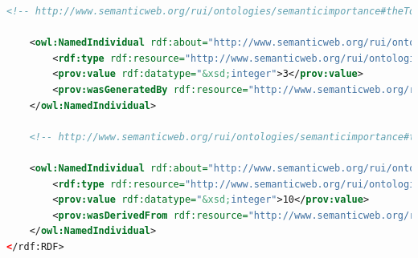 \begin{lstlisting}[language=XML,caption={Semantic Importance Ontology File (update this file)}]
    <!-- http://www.semanticweb.org/rui/ontologies/semanticimportance#theTotalTimesOfADataItemUsedByQueryEngineForResults -->

    <owl:NamedIndividual rdf:about="http://www.semanticweb.org/rui/ontologies/semanticimportance#theTotalTimesOfADataItemUsedByQueryEngineForResults">
        <rdf:type rdf:resource="http://www.semanticweb.org/rui/ontologies/semanticimportance#QueryParticipationFrequency"/>
        <prov:value rdf:datatype="&xsd;integer">3</prov:value>
        <prov:wasGeneratedBy rdf:resource="http://www.semanticweb.org/rui/ontologies/semanticimportance#aDataItemIsUsedByQueryEngineForResults"/>
    </owl:NamedIndividual>
    
    <!-- http://www.semanticweb.org/rui/ontologies/semanticimportance#trustworthinessInstance -->

    <owl:NamedIndividual rdf:about="http://www.semanticweb.org/rui/ontologies/semanticimportance#trustworthinessInstance">
        <rdf:type rdf:resource="http://www.semanticweb.org/rui/ontologies/semanticimportance#DataTrustWorthiness"/>
        <prov:value rdf:datatype="&xsd;integer">10</prov:value>
        <prov:wasDerivedFrom rdf:resource="http://www.semanticweb.org/rui/ontologies/semanticimportance#aTrustEquation"/>
    </owl:NamedIndividual>
</rdf:RDF>
\end{lstlisting}
%